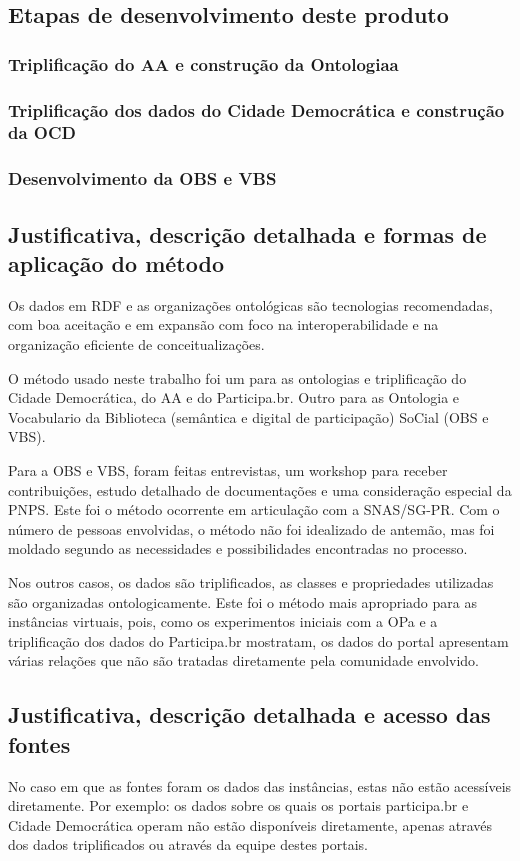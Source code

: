 \documentclass[12pt]{article}
\begin{document}
\subsection{Etapas de desenvolvimento deste produto}
\subsubsection{Triplificação do AA e construção da Ontologiaa}
\subsubsection{Triplificação dos dados do Cidade Democrática e construção da OCD}
\subsubsection{Desenvolvimento da OBS e VBS}
\subsection{Justificativa, descrição detalhada e formas de aplicação do método}
Os dados em RDF e as organizações ontológicas são tecnologias recomendadas, com boa aceitação e em expansão com foco na interoperabilidade e na organização eficiente de conceitualizações.

O método usado neste trabalho foi um para as ontologias e triplificação do Cidade Democrática, do AA e do Participa.br. Outro para as Ontologia e Vocabulario da Biblioteca (semântica e digital de participação) SoCial (OBS e VBS).

Para a OBS e VBS, foram feitas entrevistas, um workshop para receber contribuições, estudo detalhado de documentações e uma consideração especial da PNPS. Este foi o método ocorrente em articulação com a SNAS/SG-PR. Com o número de pessoas envolvidas, o método não foi idealizado de antemão, mas foi moldado segundo as necessidades e possibilidades encontradas no processo.

Nos outros casos, os dados são triplificados, as classes e propriedades utilizadas são organizadas ontologicamente. Este foi o método mais apropriado para as instâncias virtuais, pois, como os experimentos iniciais com a OPa e a triplificação dos dados do Participa.br mostratam, os dados do portal apresentam várias relações que não são tratadas diretamente pela comunidade envolvido.

\subsection{Justificativa, descrição detalhada e acesso das fontes}
No caso em que as fontes foram os dados das instâncias, estas não estão acessíveis diretamente. Por exemplo: os dados sobre os quais os portais participa.br e Cidade Democrática operam não estão disponíveis diretamente, apenas através dos dados triplificados ou através da equipe destes portais.
\end{document}
